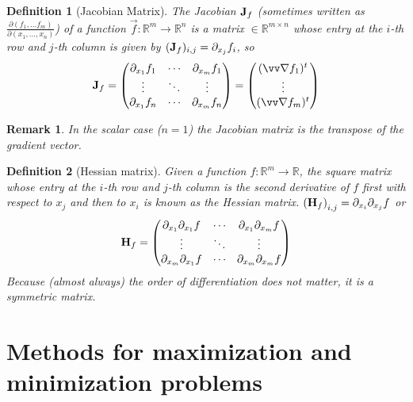 \documentclass[twocolumn, margin=small]{tex/hsrzf}
\theoremstyle{fuvarzf}
\newtheorem{definition}{Definition}
\newtheorem{remark}{Remark}
\begin{document}
\begin{definition}[Jacobian Matrix]
  The \emph{Jacobian} \(\bm{\mathrm{J}}_f\) (sometimes written as
  \(\frac{\partial(f_1,\ldots f_m)}{\partial(x_1,\ldots,x_n)}\)) of a function
  \(\vec{f}: \mathbb{R}^m \to \mathbb{R}^n\) is a matrix
  \(\in\mathbb{R}^{m\times n}\) whose entry at the \(i\)-th row and \(j\)-th
  column is given by \((\bm{\mathrm{J}}_f)_{i,j} = \partial_{x_j} f_i\), so
  \[
    \mx{J}_f = \begin{pmatrix}
      \partial_{x_1} f_1 & \cdots & \partial_{x_m} f_1 \\
      \vdots & \ddots & \vdots \\
      \partial_{x_1} f_n & \cdots & \partial_{x_m} f_n \\
    \end{pmatrix}
    = \begin{pmatrix}
      (\grad f_1)^t \\
      \vdots \\
      (\grad f_m)^t \\
    \end{pmatrix}
  \]
\end{definition}

\begin{remark}
  In the scalar case (\(n = 1\)) the Jacobian matrix is the transpose of the
  gradient vector.
\end{remark}

\begin{definition}[Hessian matrix]
  Given a function \(f: \mathbb{R}^m \to \mathbb{R}\), the square matrix whose
  entry at the \(i\)-th row and \(j\)-th column is the second derivative of
  \(f\) first with respect to \(x_j\) and then to \(x_i\) is known as the
  \emph{Hessian} matrix.
  \(
    \left(\bm{\mathrm{H}}_f\right)_{i,j} = \partial_{x_i}\partial_{x_j} f
  \)
  or
  \[
    \bm{\mathrm{H}}_f = \begin{pmatrix}
      \partial_{x_1}\partial_{x_1} f & \cdots & \partial_{x_1}\partial_{x_m} f \\
      \vdots & \ddots & \vdots \\
      \partial_{x_m}\partial_{x_1} f & \cdots & \partial_{x_m}\partial_{x_m} f \\
    \end{pmatrix}
  \]
  Because (almost always) the order of differentiation
  does not matter, it is a symmetric matrix.
\end{definition}


\section{Methods for maximization and minimization problems}
\end{document}
